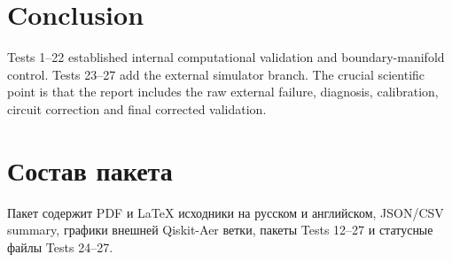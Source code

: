 \documentclass[12pt,a4paper]{article}
\begin{document}
\section{Conclusion}
Tests 1--22 established internal computational validation and boundary-manifold control. Tests 23--27 add the external simulator branch. The crucial scientific point is that the report includes the raw external failure, diagnosis, calibration, circuit correction and final corrected validation.

\appendix\section{Состав пакета}
Пакет содержит PDF и LaTeX исходники на русском и английском, JSON/CSV summary, графики внешней Qiskit-Aer ветки, пакеты Tests 12--27 и статусные файлы Tests 24--27.
\end{document}
